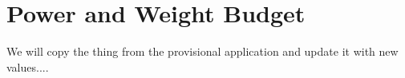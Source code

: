\section{Power and Weight Budget}
\label{sec:PW_Budget}
We will copy the thing from the provisional application and update it with new values....
